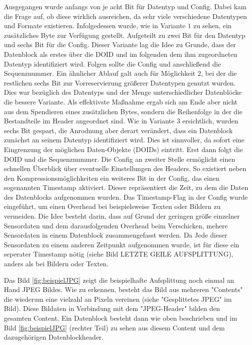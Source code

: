 Ausgegangen wurde anfangs von je acht Bit für Datentyp und Config. Dabei kam die
Frage auf, ob diese wirklich ausreichen, da sehr viele verschiedene Datentypen
und Formate existieren. Infolgedessen wurde, wie in Variante $1$ zu sehen, ein
zusätzliches Byte zur Verfügung gestellt. Aufgeteilt zu zwei Bit für den
Datentyp und sechs Bit für die Config. Dieser Variante lag die Idee zu Grunde,
dass der Datenblock als erstes über die DOID und im folgenden dem ihm
zugeordneten Datentyp identifiziert wird. Folgen sollte die Config und
anschließend die Sequenznummer. Ein ähnlicher Ablauf galt auch für Möglichkeit
$2$, bei der die restlichen sechs Bit zur Vorreservierung größerer Datentypen
genutzt wurden. Dies war bezüglich des Datentyps und der Menge unterschiedlicher
Datenblöcke die bessere Variante.  Als effektivste Maßnahme
ergab sich am Ende aber nicht aus dem Spendieren eines zusätzlichen Bytes,
sondern die Reihenfolge in der die Bestandteile im Header angeordnet sind. Wie
in Variante $3$ ersichtlich, wurden sechs Bit gespart, die Anrodnung aber derart
verändert, dass ein Datenblock zunächst an seinem Datentyp identifiziert wird.
Dies ist sinnvoller, da sofort eine Eingrenzung der möglichen Daten-Objekte
(DOIDs) eintritt. Erst dann folgt die DOID und die Sequenznummer. Die Config
an zweiter Stelle ermöglicht einen schnellen Überblick über eventuelle
Einstellungen des Headers. So existiert neben den Kompressionsmöglichkeiten ein
weiteres Bit in der Config, das einen sogenannten Timestamp aktiviert. Dieser
repräsentiert die Zeit, zu dem die Daten des Datenblocks aufgenommen wurden. Das
Timestamp-Flag in der Config wurde eingeführt, um einen Overhead bei
beispielsweise Texten oder Bildern zu vermeiden. Die Idee besteht darin, dass
auf Grund der geringen größe einzelner Sensordaten und dem darausfolgenden
Overhead beim Verschicken, mehere Sensordaten in einem Datenblock
zusammengefasst werden. Da Jede dieser Sensordaten zu einem anderen Zeitpunkt
aufgenommen wurde, ist für diese ein seperater Timestamp nötig (siehe Bild
LETZTE GEILE AUFSPLITTUNG), anders als bei Bildern oder Texten. 



Das Bild \ref{fig:beispielJPG} zeigt die beispielhafte Aufsplittung noch einmal
an Hand JPEG Bildes. Wie zu erkennen, besteht das Bild aus mehreren "Contents"
die wiederum eine vielzahl an Pixeln vereinen (siehe "Gesplittetes JPEG" im
Bild). Diese Bildaten in Verbindung mit dem "JPEG-Header" bilden den gesamten
Content. Ein Datenblock besteht dann wie oben beschrieben und im Bild
\ref{fig:beispielJPG} (rechter Teil) zu sehen aus diesem Content und dem
dazugehörigen Datenblockheader.


